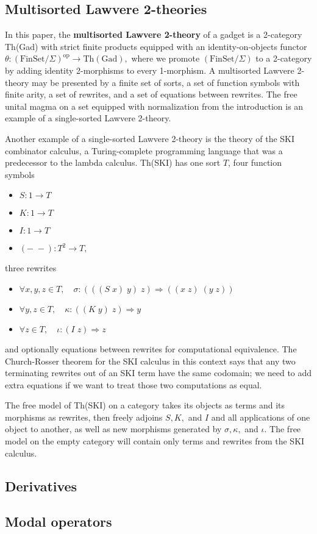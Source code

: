 \documentclass{article}
\newcommand{\maps}{\colon}
\newcommand{\FinSet}{\mathrm{FinSet}}
\newcommand{\op}{\mathrm{op}}
\begin{document}
\subsection {Multisorted Lawvere 2-theories}
In this paper, the {\bf multisorted Lawvere 2-theory} of a gadget is a 2-category Th(Gad) with strict finite products equipped with an identity-on-objects functor $\theta\maps (\FinSet/\Sigma)^\op \to \mathrm{Th(Gad)},$ where we promote $(\FinSet/\Sigma)$ to a 2-category by adding identity 2-morphisms to every 1-morphism.  A multisorted Lawvere 2-theory may be presented by a finite set of sorts, a set of function symbols with finite arity, a set of rewrites, and a set of equations between rewrites.  The free unital magma on a set equipped with normalization from the introduction is an example of a single-sorted Lawvere 2-theory.  

Another example of a single-sorted Lawvere 2-theory is the theory of the SKI combinator calculus, a Turing-complete programming language that was a predecessor to the lambda calculus.  Th(SKI) has one sort $T$, four function symbols
\begin{itemize}
  \item $S\maps 1 \to T$
  \item $K\maps 1 \to T$
  \item $I\maps 1 \to T$
  \item $(-\;-)\maps T^2 \to T,$
\end{itemize}
three rewrites
\begin{itemize}
  \item $\forall x,y,z \in T, \quad \sigma \maps (((S\; x)\; y)\; z) \Rightarrow ((x\; z)\; (y\; z))$
  \item $\forall y,z \in T, \quad \kappa \maps ((K\; y)\; z) \Rightarrow y$
  \item $\forall z \in T, \quad \iota \maps (I\; z) \Rightarrow z$
\end{itemize}
and optionally equations between rewrites for computational equivalence.  The Church-Rosser theorem for the SKI calculus in this context says that any two terminating rewrites out of an SKI term have the same codomain; we need to add extra equations if we want to treat those two computations as equal.

The free model of Th(SKI) on a category takes its objects as terms and its morphisms as rewrites, then freely adjoins $S,K,$ and $I$ and all applications of one object to another, as well as new morphisms generated by $\sigma,\kappa,$ and $\iota.$  The free model on the empty category will contain only terms and rewrites from the SKI calculus.

\subsection{Derivatives}

\subsection{Modal operators}
\end{document}
